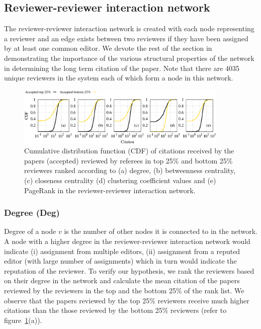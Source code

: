 \noindent

\subsection{Reviewer-reviewer interaction network}
\label{rev_int_net} 
The reviewer-reviewer interaction network is created with each node representing a reviewer and an edge exists between two reviewers if they have been assigned by at least one common editor. We devote the rest of the section in demonstrating the importance of the various structural properties of the network in determining the long term citation of the paper. Note that there are 4035 unique reviewers in the system each of which form a node in this network.

\begin{figure}
\centering
\includegraphics[width = 0.9\textwidth]{./texfiles/Chapter_4/jcdl/figures/citation_.eps} 
\caption{\label{fig:net_citation} Cumulative distribution function (CDF) of citations received by the papers (accepted) reviewed by referees in top 25\% and bottom 25\% reviewers ranked according to (a) degree, (b) betweenness centrality, (c) closeness centrality (d) clustering coefficient values and (e) PageRank in the reviewer-reviewer interaction network.\vspace{4mm}}
\end{figure}

\subsubsection{Degree (Deg)}
Degree of a node $v$ is the number of other nodes it is connected to in the network. A node with a higher degree in the reviewer-reviewer interaction network would indicate (i) assignment from multiple editors, (ii) assignment from a reputed editor (with large number of assignments) which in turn would indicate the reputation of the reviewer. To verify our hypothesis, we rank the reviewers based on their degree in the network and calculate the mean citation of the papers reviewed by the reviewers in the top and the bottom 25\% of the rank list. We observe that  the papers reviewed by the top 25\% reviewers receive much higher citations than the those reviewed by the bottom 25\% reviewers (refer to figure~\ref{fig:net_citation}(a)).    

